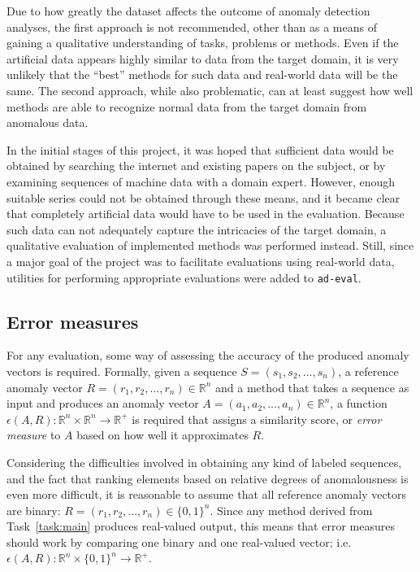 Due to how greatly the dataset affects the outcome of anomaly detection analyses, the first approach is not recommended, other than as a means of gaining a qualitative understanding of tasks, problems or methods. Even if the artificial data appears highly similar to data from the target domain, it is very unlikely that the ``best'' methods for such data and real-world data will be the same. The second approach, while also problematic, can at least suggest how well methods are able to recognize normal data from the target domain from anomalous data.

In the initial stages of this project, it was hoped that sufficient data would be obtained by searching the internet and existing papers on the subject, or by examining sequences of machine data with a domain expert. However, enough suitable series could not be obtained through these means, and it became clear that completely artificial data would have to be used in the evaluation. Because such data can not adequately capture the intricacies of the target domain, a qualitative evaluation of implemented methods was performed instead. Still, since a major goal of the project was to facilitate evaluations using real-world data, utilities for performing appropriate evaluations were added to \texttt{ad-eval}.
 
\subsection{Error measures}
\label{sect:evaluation_measures}

For any evaluation, some way of assessing the accuracy of the produced anomaly vectors is required. Formally, given a sequence $S = (s_1, s_2, \dots, s_n)$, a reference anomaly vector $R = (r_1, r_2, \dots, r_n) \in \mathbb{R}^{n}$ and a method that takes a sequence as input and produces an anomaly vector $A = (a_1, a_2, \dots, a_n) \in \mathbb{R}^{n}$, a function $\epsilon(A, R): \mathbb{R}^n \times \mathbb{R}^n \rightarrow \mathbb{R}^+$ is required that assigns a similarity score, or \emph{error measure} to $A$ based on how well it approximates $R$.

Considering the difficulties involved in obtaining any kind of labeled sequences, and the fact that ranking elements based on relative degrees of anomalousness is even more difficult, it is reasonable to assume that all reference anomaly vectors are binary: $R = (r_1, r_2, \dots, r_n) \in {\{0,1\}}^n$. Since any method derived from Task~\ref{task:main} produces real-valued output, this means that error measures should work by comparing one binary and one real-valued vector; i.e.\ $\epsilon{(A, R)}: \mathbb{R}^{n} \times {\{0,1\}}^n \rightarrow \mathbb{R}^+$.

